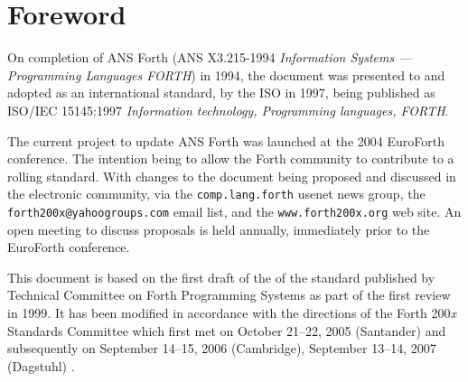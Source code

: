 \chapter*{Foreword}
\label{foreword}

On completion of ANS Forth (ANS X3.215-1994 \emph{Information Systems
--- Programming Languages FORTH}) in 1994, the document was presented
to and adopted as an international standard, by the ISO in 1997, being
published as ISO/IEC 15145:1997 \emph{Information technology,
Programming languages, FORTH}.

The current project to update ANS Forth was launched at the 2004
EuroForth conference.  The intention being to allow the Forth community
to contribute to a rolling standard.  With changes to the document
being proposed and discussed in the electronic community, via the
\texttt{comp.lang.forth} usenet news group, the
\texttt{forth200x@yahoogroups.com} email list, and the
\texttt{www.forth200x.org} web site.  An open meeting to discuss
proposals is held annually, immediately prior to the EuroForth
conference.

This document is based on the first draft of the of the standard
published by Technical Committee on Forth Programming Systems as part
of the first review in 1999. It has been modified in accordance with
the directions of the Forth 200\emph{x} Standards Committee which first
met on October 21--22, 2005 (Santander) and subsequently on
September 14--15, 2006 (Cambridge),
September 13--14, 2007 (Dagstuhl)%
%
.
